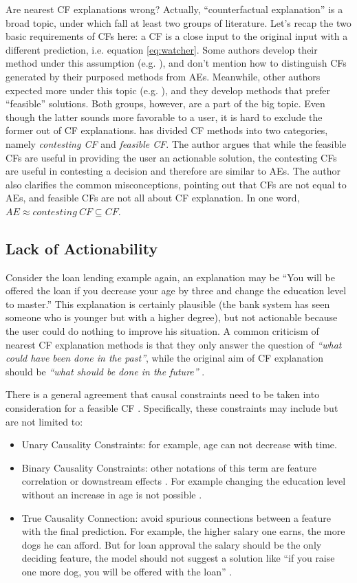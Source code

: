Are nearest CF explanations wrong? Actually, ``counterfactual explanation'' is a broad topic, under which fall at least two groups of literature. Let's recap the two basic requirements of CFs here: a CF is a close input to the original input with a different prediction, i.e. equation \ref{eq:watcher}. Some authors develop their method under this assumption (e.g. \cite{certifai,watcher2017,DiCE}), and don't mention how to distinguish CFs generated by their purposed methods from AEs. Meanwhile, other authors expected more under this topic (e.g. \cite{prototype}), and they develop methods that prefer ``feasible'' solutions. Both groups, however, are a part of the big topic. Even though the latter sounds more favorable to a user, it is hard to exclude the former out of CF explanations. \citeauthor{CFandAE} \cite{CFandAE} has divided CF methods into two categories, namely \emph{contesting CF} and \emph{feasible CF}. The author argues that while the feasible CFs are useful in providing the user an actionable solution, the contesting CFs are useful in contesting a decision and therefore are similar to AEs. The author also clarifies the common misconceptions, pointing out that CFs are not equal to AEs, and feasible CFs are not all about CF explanation. In one word, $AE\approx contesting\ CF\subseteq CF$.
 \subsection{Lack of Actionability}
Consider the loan lending example again, an explanation may be ``You will be offered the loan if you decrease your age by three and change the education level to master.'' This explanation is certainly plausible (the bank system has seen someone who is younger but with a higher degree), but not actionable because the user could do nothing to improve his situation. A common criticism of nearest CF explanation methods is that they only answer the question of \emph{``what could have been done in the past''}, while the original aim of CF explanation should be \emph{``what should be done in the future''} \cite{algorithmicrecourse}.

There is a general agreement that causal constraints need to be taken into consideration for a feasible CF \cite{algorithmicrecourse}. Specifically, these constraints may include but are not limited to:
 \begin{itemize}
   \item Unary Causality Constraints: for example, age can not decrease with time.
   \item Binary Causality Constraints: other notations of this term are feature correlation \cite{preservingCausal} or downstream effects \cite{algorithmicrecourse}. For example changing the education level without an increase in age is not possible \cite{DiCE}.
   \item True Causality Connection: avoid spurious connections between a feature with the final prediction. For example, the higher salary one earns, the more dogs he can afford. But for loan approval the salary should be the only deciding feature, the model should not suggest a solution like ``if you raise one more dog, you will be offered with the loan'' \cite{diffThatMakesDiff}.
 \end{itemize}

